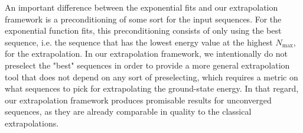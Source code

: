 An important difference between the exponential fits and our extrapolation framework is a preconditioning of some sort for the input sequences. For the exponential function fits, this preconditioning consists of only using the best sequence, i.e. the sequence that has the lowest energy value at the highest $N_\mathrm{max}$, for the extrapolation. In our extrapolation framework, we intentionally do not preselect the "best" sequences in order to provide a more general extrapolation tool that does not depend on any sort of preselecting, which requires a metric on what sequences to pick for extrapolating the ground-state energy. In that regard, our extrapolation framework produces promisable results for unconverged sequences, as they are already comparable in quality to the classical extrapolations.
